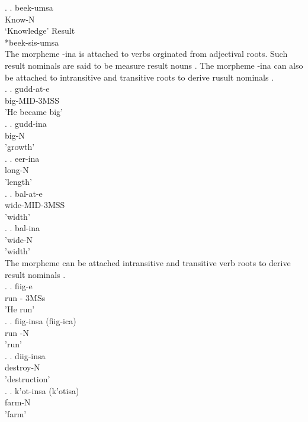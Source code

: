 \documentclass[11pt,a4paper]{article}
\begin{document}
\ex.
\ag.
beek-umsa\\
Know-N\\
‘Knowledge’ Result\\
*beek-sis-umsa\\ 


The morpheme -ina is attached to verbs orginated from adjectival roots. Such result nominals are said to be measure result nouns \cite{uth2015event}. The morpheme -ina can also be attached to intransitive and transitive roots to derive rusult nominals \cite{gaddisa2001,temesgen1985,tolemariam2011}. \\

\ex.
\ag.
gudd-at-e\\
big-MID-3MSS\\
'He became big'\\

\ex.
\ag.
gudd-ina\\
big-N\\
'growth'\\

\ex.
\ag.
eer-ina\\
long-N\\
'length'\\

\ex.
\ag.
bal\textipa\textbarglotstop-at-e\\
wide-MID-3MSS\\
'width'\\

\ex.
\ag.
bal\textipa\textbarglotstop-ina\\
'wide-N\\
'width'\\

The morpheme can be attached intransitive and transitive verb roots to derive result nominals \cite{gaddisa2001,temesgen1985,tolemariam2011}.\\

\ex.
\ag.
fiig-e \\
run - 3MSs\\
'He run'\\

\ex.
\ag.
fiig-insa (fiig-ica)\\
run -N\\
'run'\\

\ex.
\ag.
diig-insa\\
destroy-N\\
'destruction'\\

\ex.
\ag.
k'ot-insa (k'otisa)\\
farm-N\\
'farm'\\
\end{document}
